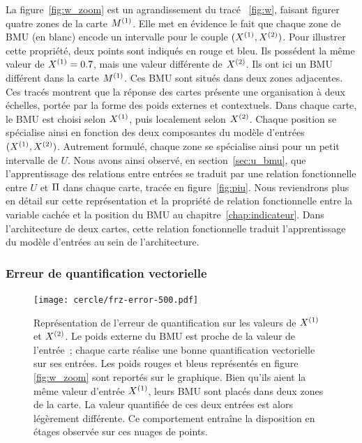 \documentclass[../main]{subfiles}
\begin{document}
La figure~\ref{fig:w_zoom} est un agrandissement du tracé ~\ref{fig:w}, faisant figurer quatre zones de la carte $M^{({1})}$. Elle met en évidence le fait que chaque zone de BMU (en blanc) encode un intervalle pour le couple $(X^{({1})}, X^{({2})})$.
Pour illustrer cette propriété, deux points sont indiqués en rouge et bleu. Ils possédent la même valeur de $X^{({1})} = 0.7$, mais une valeur différente de $X^{({2})}$. 
Ils ont ici un BMU différent dans la carte $M^{({1})}$. Ces BMU sont situés dans deux zones adjacentes.
Ces tracés montrent que la réponse des cartes présente une organisation à deux échelles, portée par la forme des poids externes et contextuels. 
Dans chaque carte, le BMU est choisi selon $X^{({1})}$, puis localement selon $X^{({2})}$.
Chaque position se spécialise ainsi en fonction des deux composantes du modèle d'entrées $(X^{({1})}, X^{({2})})$. 
Autrement formulé, chaque zone se spécialise ainsi pour un petit intervalle de $U$.
Nous avons ainsi observé, en section~\ref{sec:u_bmu}, que l'apprentissage des relations entre entrées se traduit par une relation fonctionnelle entre $U$ et $\Pi$ dans chaque carte, tracée en figure~\ref{fig:piu}.
Nous reviendrons plus en détail sur cette représentation et la propriété de relation fonctionnelle entre la variable cachée et la position du BMU au chapitre~\ref{chap:indicateur}. Dans l'architecture de deux cartes, cette relation fonctionnelle traduit l'apprentissage du modèle d'entrées au sein de l'architecture.

\subsubsection{Erreur de quantification vectorielle}

\begin{figure}
	\centering\texttt{[image: cercle/frz-error-500.pdf]}
	\caption{Représentation de l'erreur de quantification sur les valeurs de $X^{({1})}$ et $X^{({2})}$. Le poids externe du BMU est proche de la valeur de l'entrée~; chaque carte réalise une bonne quantification vectorielle sur ses entrées. 
	Les poids rouges et bleus représentés en figure \ref{fig:w_zoom} sont reportés sur le graphique. Bien qu'ils aient la même valeur d'entrée $X^{({1})}$, leurs BMU sont placés dans deux zones de la carte. La valeur quantifiée de ces deux entrées est alors légèrement différente. Ce comportement entraîne la disposition en étages observée sur ces nuages de points. \label{fig:qv}}
\end{figure}
\end{document}
